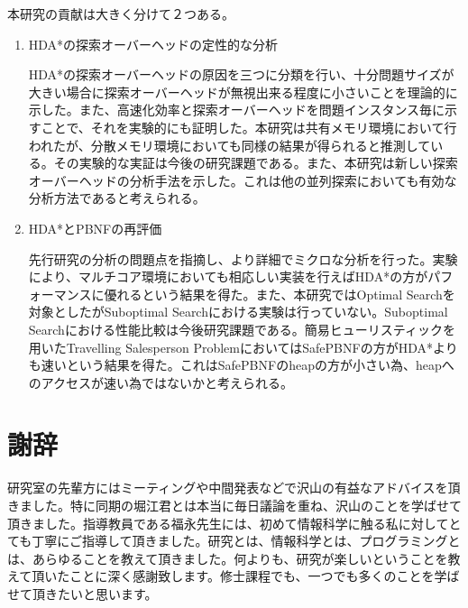 \documentclass[uplatex]{jsarticle}
\begin{document}
本研究の貢献は大きく分けて２つある。

\begin{enumerate}
\item HDA*の探索オーバーヘッドの定性的な分析
\vspace{3mm}

HDA*の探索オーバーヘッドの原因を三つに分類を行い、十分問題サイズが大きい場合に探索オーバーヘッドが無視出来る程度に小さいことを理論的に示した。また、高速化効率と探索オーバーヘッドを問題インスタンス毎に示すことで、それを実験的にも証明した。本研究は共有メモリ環境において行われたが、分散メモリ環境においても同様の結果が得られると推測している。その実験的な実証は今後の研究課題である。また、本研究は新しい探索オーバーヘッドの分析手法を示した。これは他の並列探索においても有効な分析方法であると考えられる。
\newline

\item HDA*とPBNFの再評価
\vspace{3mm}

先行研究の分析の問題点を指摘し、より詳細でミクロな分析を行った。実験により、マルチコア環境においても相応しい実装を行えばHDA*の方がパフォーマンスに優れるという結果を得た。また、本研究ではOptimal Searchを対象としたがSuboptimal Searchにおける実験は行っていない。Suboptimal Searchにおける性能比較は今後研究課題である。簡易ヒューリスティックを用いたTravelling Salesperson ProblemにおいてはSafePBNFの方がHDA*よりも速いという結果を得た。これはSafePBNFのheapの方が小さい為、heapへのアクセスが速い為ではないかと考えられる。


\end{enumerate}

\newpage
\section{謝辞}

研究室の先輩方にはミーティングや中間発表などで沢山の有益なアドバイスを頂きました。特に同期の堀江君とは本当に毎日議論を重ね、沢山のことを学ばせて頂きました。指導教員である福永先生には、初めて情報科学に触る私に対してとても丁寧にご指導して頂きました。研究とは、情報科学とは、プログラミングとは、あらゆることを教えて頂きました。何よりも、研究が楽しいということを教えて頂いたことに深く感謝致します。修士課程でも、一つでも多くのことを学ばせて頂きたいと思います。

\newpage




\newpage

\printindex
\end{document}
